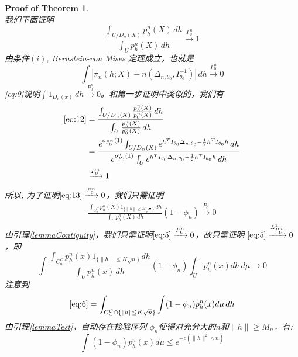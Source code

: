 \documentclass[review]{elsarticle}
\newtheorem{proofOfTheorem}{Proof of Theorem}
\begin{document}
\begin{proofOfTheorem}
\begin{equation}
\end{equation}
我们下面证明
\begin{equation}\label{eq:12}
    \frac{\int_{U/D_n(X)} p_h^n(X)\, dh}{\int_U p_h^n(X)\, dh}\xrightarrow{P_0^n}1
\end{equation}
由条件$(i)$, Bernstein-von Mises 定理成立，也就是
\begin{equation}\label{eq:9}
 \int |\pi_{n}(h;X)-n(\Delta_{n,\theta_{0}},I_{\theta_{0}}^{-1})|\, dh\xrightarrow{P_0^n}0   
\end{equation}
\eqref{eq:9}说明$\int 1_{D_n(x)}\, dh\xrightarrow{P_0^n}0$。和第一步证明中类似的，我们有
\begin{equation}
\begin{aligned}
    \eqref{eq:12}&=\frac{\int_{U/D_n(X)} \frac{p_h^n(X)}{p_0^n(X)}\, dh}{\int_U \frac{p_h^n(X)}{p_0^n(X)}\, dh}\\
                 &=\frac{e^{o_{P^n_0}(1)}\int_{U/D_n(X)} e^{h^T I_{\theta_0}\Delta_{n,\theta_0}-\frac{1}{2}h^TI_{\theta_0}h} \, dh}{e^{o^n_{P_0}(1)}\int_U e^{h^T I_{\theta_0}\Delta_{n,\theta_0}-\frac{1}{2}h^TI_{\theta_0}h} \, dh}\\
                 &\xrightarrow{P_0^n} 1
\end{aligned}
\end{equation}
所以, 为了证明$\eqref{eq:13}\xrightarrow{P_0^n}0$，我们只需证明
\begin{equation}\label{eq:5}
    \begin{aligned}
        \frac{\int_{C_n^C}p_h^n(X)1_{\{\|h\|\leq K\sqrt{n}\}}\, dh}{\int_U p_h^n(X)\, dh}(1-\phi_n)\xrightarrow{P_0^n} 0
    \end{aligned}
\end{equation}
由引理\ref{lemmaContiguity}，我们只需证明$\eqref{eq:5}\xrightarrow{P_U^n}0$，故只需证明 $\eqref{eq:5}\xrightarrow{L^1_{P_U^n}}0$，即
\begin{equation}\label{eq:6}
    \int \frac{\int_{C_n^C}p_h^n(x)1_{\{\|h\|\leq K\sqrt{n}\}}\, dh}{\int_U p_h^n(x)\, dh}(1-\phi_n)\int_U p_h^n(x)dh \, d\mu  \to 0
\end{equation}
注意到
\begin{equation}\label{eq:7}
    \eqref{eq:6}=\int_{C_n^C\cap \{\|h\|\leq K\sqrt{n}\}} \int (1-\phi_n)p_h^n(x)d\mu \, dh 
\end{equation}
由引理\ref{lemmaTest}，自动存在检验序列 $\phi_n$使得对充分大的$n$和$\|h\|\geq M_n$，有:
\begin{equation}
\int (1-\phi_n)p^n_h(x)d\mu\leq e^{-c(\|h\|^2\wedge n)}
\end{equation}

\end{proofOfTheorem}
\end{document}

